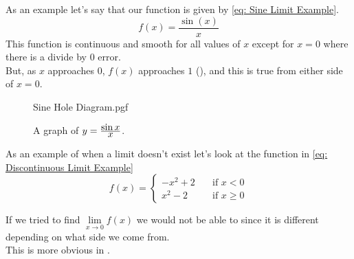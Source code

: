 \documentclass[main.tex]{subfiles}
\begin{document}
                    As an example let's say that our function is given by \eqref{eq: Sine Limit Example}.
                    \begin{equation}
                        f(x) = \frac{\sin(x)}{x}
                        \label{eq: Sine Limit Example}
                    \end{equation} 
                    This function is continuous and smooth for all values of $x$ except for $x=0$ where there is a divide by $0$ error.\\
                    But, as $x$ approaches $0$, $f(x)$ approaches $1$ (), and this is true from either side of $x=0$.
    
                    \begin{figure}[!h]
                        \centering
                        \scalebox{0.7}
                        {
                            \begin{adjustbox}{clip,trim=10mm 40mm 10mm 40mm}
                                {{Sine Hole Diagram.pgf}}
                            \end{adjustbox}
                        }
    
                        \caption{A graph of $y = \frac{\displaystyle \sin x}{\displaystyle x}$.}
                        \label{fig: Sine Limit Example Diagram}
                    \end{figure}
                    \FloatBarrier
    
                    As an example of when a limit doesn't exist let's look at the function in \eqref{eq: Discontinuous Limit Example}
                    \begin{equation}
                        f(x) = \left\{\begin{array}{cr}
                            -x^2 + 2 &\hspace{1em} \text{if } x < 0\\[1em]
                            x^2 - 2 &\hspace{1em} \text{if } x \geq 0
                        \end{array}\right.
                        \label{eq: Discontinuous Limit Example}
                    \end{equation}
                    
                    If we tried to find $\lim\limits_{x\to 0} f(x)$ we would not be able to since it is different depending on what side we come from.\\
                    This is more obvious in .
    
\end{document}

